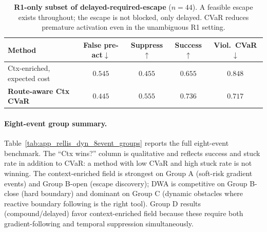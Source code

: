 \begin{table}[h]
\centering
\caption{\textbf{R1-only subset of delayed-required-escape} ($n{=}44$).
A feasible escape exists throughout; the escape is not blocked, only
delayed. CVaR reduces premature activation even in the unambiguous R1
setting.}
\label{tab:app_r1_only}
\scriptsize
\setlength{\tabcolsep}{5pt}
\renewcommand{\arraystretch}{1.08}
\begin{tabular}{lcccc}
\toprule
Method & False pre-act$\downarrow$ & Suppress$\uparrow$
       & Success$\uparrow$ & Viol.\ CVaR$\downarrow$ \\
\midrule
Ctx-enriched, expected cost
  & $0.545$ & $0.455$ & $0.655$ & $0.848$ \\
\textbf{Route-aware Ctx CVaR}
  & $\mathbf{0.445}$ & $\mathbf{0.555}$
  & $\mathbf{0.736}$ & $\mathbf{0.717}$ \\
\bottomrule
\end{tabular}
\end{table}

\paragraph{Eight-event group summary.}

Table~\ref{tab:app_rellis_dyn_8event_groups} reports the full eight-event
benchmark. The ``Ctx wins?'' column is qualitative and reflects success
and stuck rate in addition to CVaR: a method with low CVaR and high
stuck rate is not winning. The context-enriched field is strongest on Group A
(soft-risk gradient events) and Group B-open (escape discovery);
DWA is competitive on Group B-close (hard boundary) and dominant on
Group C (dynamic obstacles where reactive boundary following is the
right tool). Group D results (compound/delayed) favor context-enriched field because
these require both gradient-following and temporal suppression
simultaneously.

